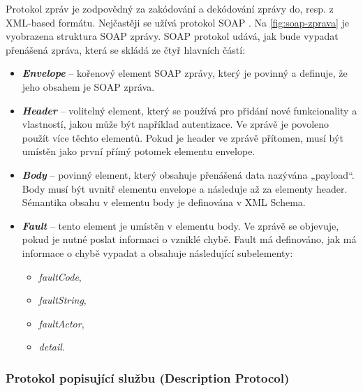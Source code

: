 \documentclass[11pt,twoside,a4paper]{book}
\begin{document}
Protokol zpráv je zodpovědný za zakódování a dekódování zprávy do, resp. z
XML-based formátu. Nejčastěji se užívá protokol
SOAP \cite{OraSOAP} \cite{WikiSOAP}. Na \ref{fig:soap-zprava} je vyobrazena
struktura SOAP zprávy. SOAP protokol udává, jak bude vypadat přenášená zpráva,
která se skládá ze čtyř hlavních částí:

\begin{itemize}
\item \textbf{\textit{Envelope}} – kořenový element SOAP zprávy, který je povinný a definuje, že jeho
obsahem je SOAP zpráva.

\item \textbf{\textit{Header}} – volitelný element, který se používá pro přidání
nové funkcionality a vlastností, jakou může být například autentizace. Ve zprávě je povoleno použít více
těchto elementů. Pokud je header ve zprávě přítomen, musí být umístěn jako první
přímý potomek elementu envelope.
 
\item \textbf{\textit{Body}} – povinný element, který obsahuje přenášená
data nazývána „payload“. Body musí být uvnitř elementu envelope a následuje až
za elementy header. Sémantika obsahu v elementu body je definována v XML Schema.

\item \textbf{\textit{Fault}} – tento element je umístěn v elementu body.
Ve zprávě se objevuje, pokud je nutné poslat informaci o vzniklé chybě. Fault má definováno, jak má informace o
chybě vypadat a obsahuje následující subelementy:

\begin{itemize}
  \item \textit{faultCode},
  \item \textit{faultString},
  \item \textit{faultActor},
  \item \textit{detail}.
\end{itemize}
\end{itemize}

\subsubsection{Protokol popisující službu (Description Protocol)}
\end{document}
